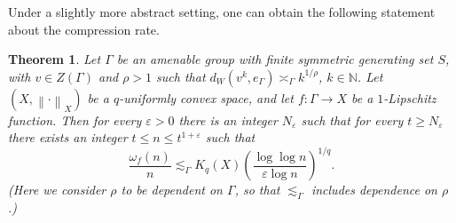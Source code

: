 \documentclass[11pt,reqno]{amsart}
\newtheorem{theorem}{Theorem}
\newcommand{\1}{\mathbf 1}
\begin{document}
Under a slightly more abstract setting, one can obtain the following statement about the compression rate.
\begin{theorem}\label{thm:amenablesublinear}
Let $\Gamma$ be an amenable group with finite symmetric generating set $S$, with $v\in Z\left(\Gamma\right)$ and $\rho>1$ such that $d_W\left(v^k,e_\Gamma\right)\asymp_\Gamma k^{1/\rho}$, $k\in \mathbb{N}$. Let $\left(X,\left\|\cdot\right\|_X\right)$ be a $q$-uniformly convex space, and let $f:\Gamma\to X$ be a $1$-Lipschitz function. Then for every $\varepsilon>0$ there is an integer $N_\varepsilon$ such that for every $t\ge N_\varepsilon$ there exists an integer $t\le n\le t^{1+\varepsilon}$ such that
\[
\frac{\omega_f\left(n\right)}{n}\lesssim_\Gamma K_q\left(X\right)\left(\frac{\log \log n}{\varepsilon\log n}\right)^{1/q}.
\]
(Here we consider $\rho$ to be dependent on $\Gamma$, so that $\lesssim_\Gamma$ includes dependence on $\rho$.)
\end{theorem}
\end{document}
